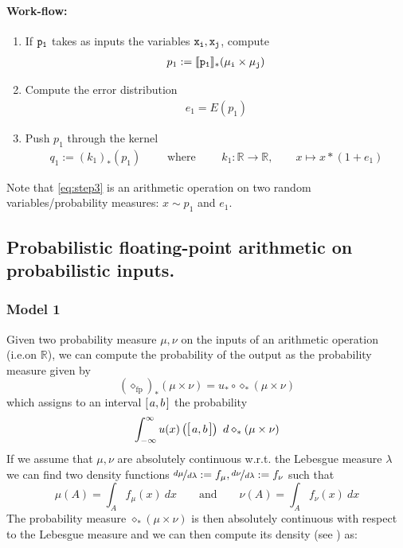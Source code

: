 \documentclass[10pt,a4paper]{article}
\theoremstyle{plain}
\theoremstyle{definition}
\newcommand{\R}{\mathbb{R}}
\newcommand{\intvl}[1]{\mathlarger{\left[\right.}  #1 \mathlarger{\left.\right]}}
\newcommand{\fp}{_{\mathrm{fp}}}
\newcommand{\sem}[1]{\llbracket #1 \rrbracket}
\begin{document}
\paragraph{Work-flow:}

\begin{enumerate}
\item If $\tt{p}_1$ takes as inputs the variables $\tt{x_i,x_j}$, compute 
\begin{align}
p_1:=\sem{\tt{p}_1}_\ast(\mu_i \times \mu_j)\label{eq:step1}
\end{align}
\item Compute the error distribution 
\begin{align}
e_1=E(p_1)\label{eq:step2}
\end{align}
\item Push $p_1$ through the kernel 
\begin{align}
q_1:=(k_1)_\ast(p_1)\qquad\text{ where }\qquad k_1: \R\to\R, \qquad x\mapsto x\ast(1+e_1)\label{eq:step3}
\end{align}
\end{enumerate}

Note that \eqref{eq:step3} is an arithmetic operation on two random variables/probability measures: $x\sim p_1$ and $e_1$. 


\subsection{Probabilistic floating-point arithmetic on probabilistic inputs.}


\subsubsection{Model 1}


Given two probability measure $\mu,\nu$ on the inputs of an arithmetic operation (i.e.\@ on $\R$), we can compute the probability of the output as the probability measure given by
\[
(\diamond\fp)_\ast(\mu\times\nu)=u_\ast\circ \diamond_\ast (\mu\times \nu)
\]
which assigns to an interval $\intvl{a,b}$ the probability
\begin{equation}\label{eq:noisyoperation}
\int_{-\infty}^{\infty} u(x)\left(\intvl{a,b}\right) ~d\diamond_\ast(\mu\times \nu)
\end{equation}
If we assume that $\mu,\nu$ are absolutely continuous w.r.t. the Lebesgue measure $\lambda$ we can find two density functions $\nicefrac{d\mu}{d\lambda}:=f_\mu,\nicefrac{d\nu}{d\lambda}:=f_\nu$ such that
\[
\mu(A)=\int_A f_\mu(x)~dx\qquad\text{and}\qquad\nu(A)=\int_A f_\nu(x)~dx
\]
The probability measure $\diamond_\ast(\mu\times \nu)$ is then absolutely continuous with respect to the Lebesgue measure and we can then compute its density (see \cite{springer1979algebra}) as:
\end{document}
